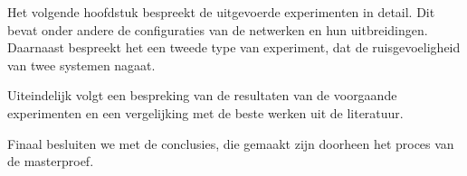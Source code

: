 Het volgende hoofdstuk bespreekt de uitgevoerde experimenten in detail. Dit bevat onder andere de configuraties van de netwerken en hun uitbreidingen. Daarnaast bespreekt het een tweede type van experiment, dat de ruisgevoeligheid van twee systemen nagaat.

Uiteindelijk volgt een bespreking van de resultaten van de voorgaande experimenten en een vergelijking met de beste werken uit de literatuur.

Finaal besluiten we met de conclusies, die gemaakt zijn doorheen het proces van de masterproef.
 
